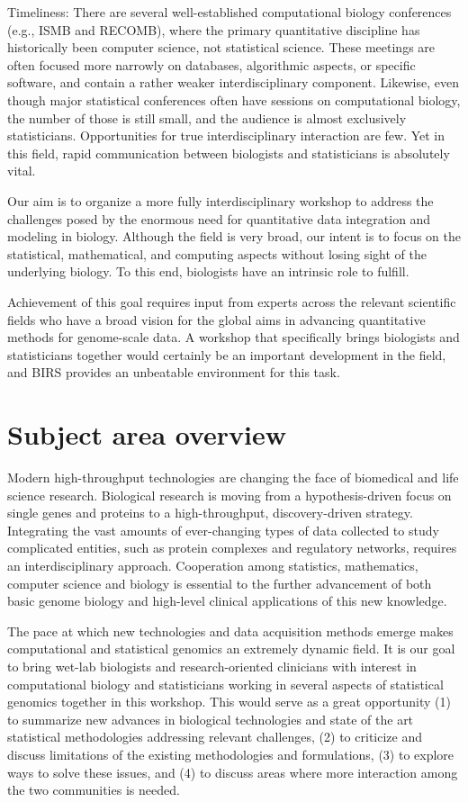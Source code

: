 \documentclass[12pt]{amsart}
\begin{document}
Timeliness:
There are several well-established computational biology
conferences (e.g., ISMB and RECOMB), where the primary quantitative
discipline has historically been computer science, not statistical science.
These meetings are often focused more narrowly on databases,
algorithmic aspects, or specific software, 
and contain a rather weaker interdisciplinary component.
Likewise, even though major statistical conferences often have
sessions on computational biology, the number of those is still small,
and the audience is almost exclusively statisticians.  
Opportunities for true interdisciplinary interaction are few.
Yet in this field, rapid communication between 
biologists and statisticians is absolutely vital.

Our aim is to organize a more fully interdisciplinary 
workshop to address the challenges posed by the 
enormous need for quantitative data integration and modeling in biology.
Although the field is very broad,
our intent is to focus on the statistical, 
mathematical, and computing aspects without 
losing sight of the underlying biology.
To this end, biologists have an intrinsic role to fulfill.

Achievement of this goal requires input from experts across 
the relevant scientific fields who have a broad vision for the 
global aims in advancing quantitative methods 
for genome-scale data. 
A workshop that specifically brings biologists and statisticians
together would certainly be an important
development in the field, 
and BIRS provides an unbeatable environment for this task. 



\section*{Subject area overview}
Modern high-throughput technologies are changing the face of
biomedical and life science research.
Biological research is moving from a hypothesis-driven
focus on single genes and proteins
to a high-throughput, discovery-driven strategy.
Integrating the vast amounts of ever-changing types of data 
collected to study complicated entities, 
such as protein complexes and regulatory networks,
requires an interdisciplinary approach. 
Cooperation among statistics, mathematics, computer science and 
biology is essential to the further advancement of
both basic genome biology and high-level clinical applications of this new knowledge.

The pace at which new technologies and data acquisition methods emerge
makes computational and statistical genomics an extremely dynamic field.  
It is our goal to bring wet-lab biologists and research-oriented clinicians with interest in
computational biology and statisticians working in several aspects of
statistical genomics together in this workshop. 
This would serve as a great opportunity 
(1) to summarize new advances in biological
technologies and state of the art statistical methodologies addressing
relevant challenges, 
(2) to criticize and discuss limitations of the
existing methodologies and formulations,
(3) to explore ways to solve
these issues, and 
(4) to discuss areas where more interaction among
the two communities is needed.
\end{document}
